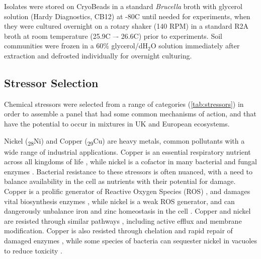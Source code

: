 \documentclass[10pt]{article}
\begin{document}
Isolates were stored on CryoBeads in a standard \textit{Brucella} broth with glycerol solution (Hardy Diagnostics, CB12) at -80\textdegree C until needed for experiments, when they were cultured overnight on a rotary shaker (140 RPM) in a standard R2A broth at room temperature (25.9\textdegree C –- 26.6\textdegree C) prior to experiments. Soil communities were frozen in a 60\% glycerol/dH$_2$O solution immediately after extraction and defrosted individually for overnight culturing. 

\subsection{Stressor Selection}
\label{S:2:2}

Chemical stressors were selected from a range of categories (\cref{tab:stressors}) in order to assemble a panel that had some common mechanisms of action, and that have the potential to occur in mixtures in UK and European ecosystems.

Nickel (\textsubscript{28}Ni) and Copper (\textsubscript{29}Cu) are heavy metals, common pollutants with a wide range of industrial applications. Copper is an essential respiratory nutrient across all kingdoms of life \cite{Babcock1992}, while nickel is a cofactor in many bacterial and fungal enzymes \cite{Zamble2015}. Bacterial resistance to these stressors is often nuanced, with a need to balance availability in the cell as nutrients with their potential for damage.  Copper is a prolific generator of Reactive Oxygen Species (ROS) \cite{Bal2002}, and damages vital biosynthesis enzymes \cite{Macomber2009}, while nickel is a weak ROS generator, and can dangerously unbalance iron and zinc homeostasis in the cell \cite{Samland2006}. Copper and nickel are resisted through similar pathways \cite{Mykytczuk2011CytoplasmicFerrooxidans}, including active efflux and membrane modification. Copper is also resisted through chelation and rapid repair of damaged enzymes \cite{Macomber2009}, while some species of bacteria can sequester nickel in vacuoles to reduce toxicity \cite{Nishimura1998}.
\end{document}
